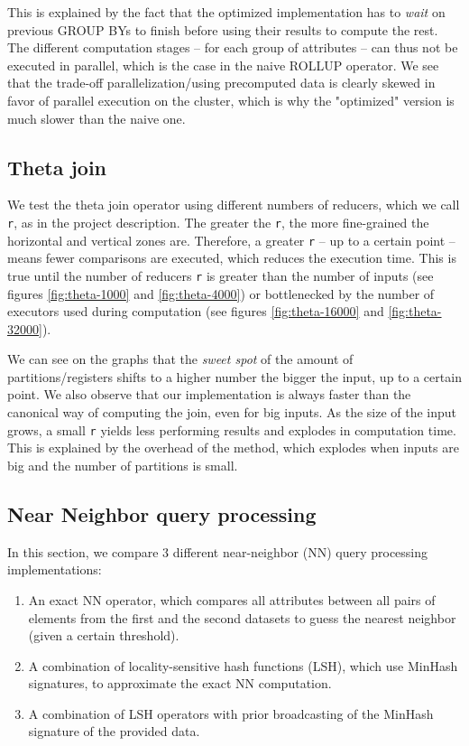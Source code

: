 \documentclass[a4paper,10pt]{IEEEtran}
\begin{document}
This is explained by the fact that the optimized implementation has to \textit{wait} on previous GROUP BYs to finish before using their results to compute the rest.
The different computation stages -- for each group of attributes -- can thus not be executed in parallel, which is the case in the naive ROLLUP operator.
We see that the trade-off parallelization/using precomputed data is clearly skewed in favor of parallel execution on the cluster, which is why the "optimized" version is much slower than the naive one.

\subsection{Theta join}

We test the theta join operator using different numbers of reducers, which we call \texttt{r}, as in the project description.
The greater the \texttt{r}, the more fine-grained the horizontal and vertical zones are.
Therefore, a greater \texttt{r} -- up to a certain point -- means fewer comparisons are executed, which reduces the execution time.
This is true until the number of reducers \texttt{r} is greater than the number of inputs (see figures \ref{fig:theta-1000} and \ref{fig:theta-4000}) or bottlenecked by the number of executors used during computation (see figures \ref{fig:theta-16000} and \ref{fig:theta-32000}).

We can see on the graphs that the \textit{sweet spot} of the amount of partitions/registers shifts to a higher number the bigger the input, up to a certain point.
We also observe that our implementation is always faster than the canonical way of computing the join, even for big inputs.
As the size of the input grows, a small \texttt{r} yields less performing results and explodes in computation time.
This is explained by the overhead of the method, which explodes when inputs are big and the number of partitions is small.

\subsection{Near Neighbor query processing}

In this section, we compare 3 different near-neighbor (NN) query processing implementations:

\begin{enumerate}
    \item An exact NN operator, which compares all attributes between all pairs of elements from the first and the second datasets to guess the nearest neighbor (given a certain threshold).
    \item A combination of locality-sensitive hash functions (LSH), which use MinHash signatures, to approximate the exact NN computation.
    \item A combination of LSH operators with prior broadcasting of the MinHash signature of the provided data.
\end{enumerate}
\end{document}
